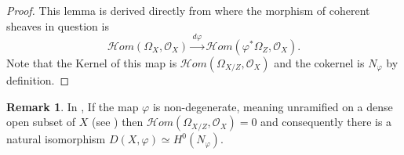 \documentclass[11pt,twoside]{amsart}
\theoremstyle{plain}
\numberwithin{equation}{section}
\theoremstyle{definition}
\newtheorem{remark}[theorem]{Remark}
\begin{document}
\begin{proof}
    This lemma is derived directly from  where the morphism of coherent sheaves in question is \[
\mathcal{H}om(\Omega_{X},\mathcal O_{X})
\xrightarrow{\,d\varphi\,}
\mathcal{H}om(\varphi^{*}\Omega_{Z},\mathcal O_{X}).
\]
Note that the Kernel of this map is $\mathcal{H}om(\Omega_{X/Z},\mathcal O_{X})$ and the cokernel is $N_{\varphi}$ by definition.
\end{proof}


\begin{remark}\label{D(X_varphi) for nondegenerate varphi}
In , If the map $\varphi$ is non-degenerate, meaning unramified on a dense open subset of $X$ (see \cite[Definition $3.4.5$]{Ser}) then $\mathcal{H}om(\Omega_{X/Z}, \mathcal{O}_X) = 0$ and consequently there is a natural isomorphism $D(X,\varphi)\simeq H^{0}(N_{\varphi})$.  
\end{remark}
\end{document}
